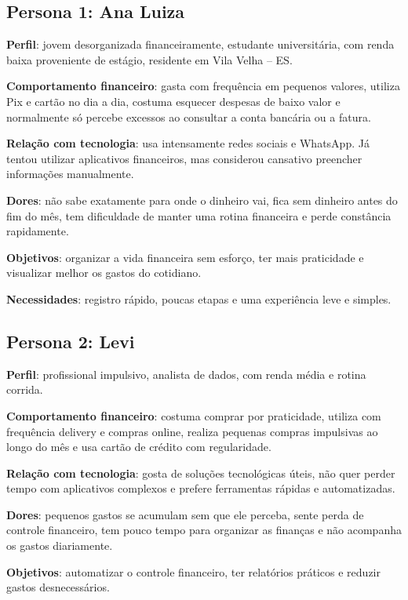 \subsection{Persona 1: Ana Luiza}

\textbf{Perfil}: jovem desorganizada financeiramente, estudante universitária, com renda baixa proveniente de estágio, residente em Vila Velha -- ES.

\textbf{Comportamento financeiro}: gasta com frequência em pequenos valores, utiliza Pix e cartão no dia a dia, costuma esquecer despesas de baixo valor e normalmente só percebe excessos ao consultar a conta bancária ou a fatura.

\textbf{Relação com tecnologia}: usa intensamente redes sociais e WhatsApp. Já tentou utilizar aplicativos financeiros, mas considerou cansativo preencher informações manualmente.

\textbf{Dores}: não sabe exatamente para onde o dinheiro vai, fica sem dinheiro antes do fim do mês, tem dificuldade de manter uma rotina financeira e perde constância rapidamente.

\textbf{Objetivos}: organizar a vida financeira sem esforço, ter mais praticidade e visualizar melhor os gastos do cotidiano.

\textbf{Necessidades}: registro rápido, poucas etapas e uma experiência leve e simples.

\subsection{Persona 2: Levi}

\textbf{Perfil}: profissional impulsivo, analista de dados, com renda média e rotina corrida.

\textbf{Comportamento financeiro}: costuma comprar por praticidade, utiliza com frequência delivery e compras online, realiza pequenas compras impulsivas ao longo do mês e usa cartão de crédito com regularidade.

\textbf{Relação com tecnologia}: gosta de soluções tecnológicas úteis, não quer perder tempo com aplicativos complexos e prefere ferramentas rápidas e automatizadas.

\textbf{Dores}: pequenos gastos se acumulam sem que ele perceba, sente perda de controle financeiro, tem pouco tempo para organizar as finanças e não acompanha os gastos diariamente.

\textbf{Objetivos}: automatizar o controle financeiro, ter relatórios práticos e reduzir gastos desnecessários.

